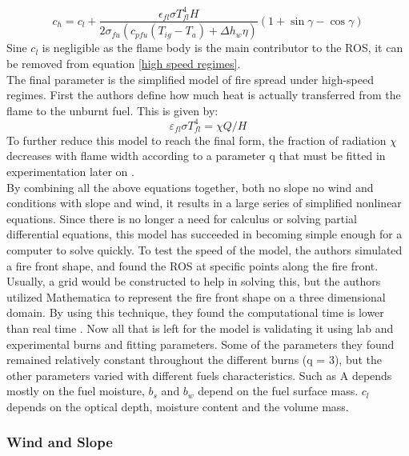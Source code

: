\documentclass{article}
\begin{document}
\begin{equation}
	\label{high speed regimes}
	c_h = c_l  + \frac {\epsilon _{fl} \sigma T^{4}_{fl} H} {2 \sigma _ {fu} (c_{pfu}(T_{ig} - T_a) + \Delta h _ w \eta)} (1 + \sin \gamma - \cos \gamma)
\end{equation}
\indent Sine $c_l$ is negligible as the flame body is the main contributor to the ROS, it can be removed from equation \ref{high speed regimes}.\\
\indent The final parameter is the simplified model of fire spread under high-speed regimes. First the authors define how much heat is actually transferred from the flame to the unburnt fuel. This is given by:
\begin{equation}
	\label{high speed regimes 2007}
	\varepsilon_{fl} \sigma T^{4}_{fl} = \chi Q / H
\end{equation} 
To further reduce this model to reach the final form, the fraction of radiation $\chi$ decreases with flame width according to a parameter q that must be fitted in experimentation later on \citep{Balbi2007}. \\
\indent By combining all the above equations together, both no slope no wind and conditions with slope and wind, it results in a large series of simplified nonlinear equations. Since there is no longer a need for calculus or solving partial differential equations, this model has succeeded in becoming simple enough for a computer to solve quickly. To test the speed of the model, the authors simulated a fire front shape, and found the ROS at specific points along the fire front. Usually, a grid would be constructed to help in solving this, but the authors utilized Mathematica to represent the fire front shape on a three dimensional domain. By using this technique, they found the computational time is lower than real time \citep{Balbi2007}. Now all that is left for the model is validating it using lab and experimental burns and fitting parameters. Some of the parameters they found remained relatively constant throughout the different burns (q = 3), but the other parameters varied with different fuels characteristics. Such as A depends mostly on the fuel moisture, $b_s$ and $b_w$ depend on the fuel surface mass. $c_l$ depends on the optical depth, moisture content and the volume mass. \\

\subsubsection{Wind and Slope}
\end{document}
